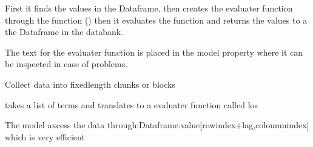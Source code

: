 \documentclass[letterpaper,10pt,english]{sphinxmanual}
\begin{document}
\begin{fulllineitems}
\begin{fulllineitems}
\sphinxAtStartPar
First it finds the values in the Dataframe, then creates the evaluater function through the  function
()
then it evaluates the function and returns the values to a the Dataframe in the databank.

\sphinxAtStartPar
The text for the evaluater function is placed in the model property 
where it can be inspected
in case of problems.

\end{fulllineitems}


\begin{fulllineitems}
\label{\detokenize{unsorted/modelsandbox_Mixin:modelsandbox_Mixin.Newmodel_Mixin.grouper}}
\pysigstartsignatures
{}
\pysigstopsignatures
\sphinxAtStartPar
Collect data into fixed\sphinxhyphen{}length chunks or blocks

\end{fulllineitems}


\begin{fulllineitems}
\label{\detokenize{unsorted/modelsandbox_Mixin:modelsandbox_Mixin.Newmodel_Mixin.outsolve2dcunk}}
\pysigstartsignatures
{}
\pysigstopsignatures
\sphinxAtStartPar
takes a list of terms and translates to a evaluater function called los

\sphinxAtStartPar
The model axcess the data through:Dataframe.value{[}rowindex+lag,coloumnindex{]} which is very efficient


\end{fulllineitems}
\end{fulllineitems}
\end{document}
